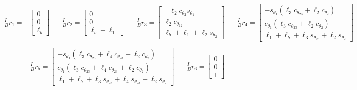 \documentclass[12pt]{report}
\begin{document}
\[
\begin{aligned}
  ^I_Br_1 =&
  \begin{bmatrix}
    0\\ 0\\ \ell_b
  \end{bmatrix} & \quad
  ^I_Br_2 =
  \begin{bmatrix}
    0\\ 0\\ \ell_b + \ell_1
  \end{bmatrix} & \quad
  ^I_Br_3 =
  \begin{bmatrix}
    -\ell_2c_{\theta_2}s_{\theta_1}\\
    \ell_2c_{\theta_{12}}\\
    \ell_b+\ell_1+\ell_2s_{\theta_2}
  \end{bmatrix} & \quad
  ^I_Br_4 =
  \begin{bmatrix}
    -s_{\theta_1}(\ell_3c_{\theta_{23}} + \ell_2c_{\theta_2}) \\
    c_{\theta_1}(\ell_3c_{\theta_{23}} + \ell_2c_{\theta_2}) \\
    \ell_1 + \ell_b + \ell_3s_{\theta_{23}} + \ell_2s_{\theta_2}
  \end{bmatrix} \\
\end{aligned}
  \]
  \[
  \begin{aligned}
  ^I_Br_5 =
  \begin{bmatrix}
    -s_{\theta_1}(\ell_3c_{\theta_{23}} + \ell_4c_{\theta_{23}} + \ell_2c_{\theta_2}) \\
    c_{\theta_1}(\ell_3c_{\theta_{23}} + \ell_4c_{\theta_{23}} + \ell_2c_{\theta_2}) \\
    \ell_1 + \ell_b + \ell_3s_{\theta_{23}} + \ell_4s_{\theta_{23}} + \ell_2s_{\theta_2}
  \end{bmatrix} & \quad
  ^I_Br_6 =
  \begin{bmatrix}
    0\\0\\1
  \end{bmatrix}
\end{aligned}
\]


\newpage
\end{document}
